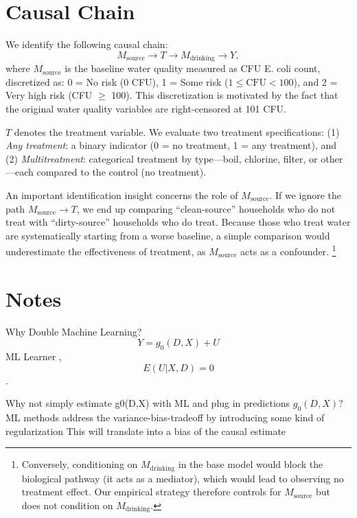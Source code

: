 \documentclass [11pt]{article}
\theoremstyle{plain}
\theoremstyle{definition}
\theoremstyle{remark}
\newcommand{\1}{\bm{1}}
\begin{document}
\begin{appendices}
\clearpage
\section{Causal Chain}
We identify the following causal chain:
\begin{equation}
M_{\text{source}} \to T \to M_{\text{drinking}} \to Y,
\end{equation}
where $M_{\text{source}}$ is the baseline water quality measured as CFU E. coli count, discretized as: 0 = No risk (0 CFU), 1 = Some risk ($1 \leq \text{CFU} < 100$), and 2 = Very high risk (CFU $\geq$ 100). This discretization is motivated by the fact that the original water quality variables are right-censored at 101 CFU.

$T$ denotes the treatment variable. We evaluate two treatment specifications: (1) \textit{Any treatment}: a binary indicator (0 = no treatment, 1 = any treatment), and (2) \textit{Multitreatment}: categorical treatment by type---boil, chlorine, filter, or other---each compared to the control (no treatment).

An important identification insight concerns the role of $M_{\text{source}}$. If we ignore the path $M_{\text{source}} \to T$, we end up comparing ``clean-source'' households who do not treat with ``dirty-source'' households who do treat. Because those who treat water are systematically starting from a worse baseline, a simple comparison would underestimate the effectiveness of treatment, as $M_{\text{source}}$ acts as a confounder. \footnote{Conversely, conditioning on $M_{\text{drinking}}$ in the base model would block the biological pathway (it acts as a mediator), which would lead to observing no treatment effect. Our empirical strategy therefore controls for $M_{\text{source}}$ but does not condition on $M_{\text{drinking}}$.}








\iffalse
\section{Notes}


Why Double Machine Learning?
$$Y=g_0(D,X) + U$$
ML Learner
, $$E(U|X,D)=0$$.
 

Why not simply estimate g0(D,X)
 with ML and plug in predictions $g_0(D,X)$?
ML methods address the variance-bias-tradeoff by introducing some kind of regularization
This will translate into a bias of the causal estimate



\end{appendices}
\end{document}
